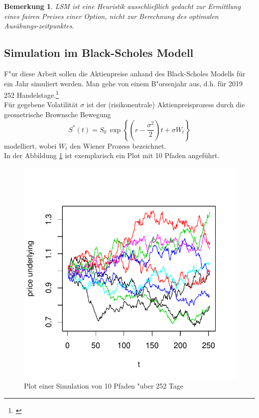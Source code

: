 \documentclass[10pt,a4paper]{article}\usepackage[]{graphicx}\usepackage[]{color}
\makeatletter
\def\maxwidth{ %
  \ifdim\Gin@nat@width>\linewidth
    \linewidth
  \else
    \Gin@nat@width
  \fi
}
\newtheorem{mybem}{Bemerkung}
\makeatother
\begin{document}
\begin{mybem}
LSM ist eine Heuristik ausschließlich gedacht zur Ermittlung eines fairen Preises einer Option, nicht zur Berechnung des optimalen Ausübungs-zeitpunktes.
\end{mybem}

\subsection{Simulation im Black-Scholes Modell}

F"ur diese Arbeit sollen die Aktienpreise anhand des Black-Scholes Modells für ein Jahr simuliert werden. Man gehe von einem B"orsenjahr aus, d.h. für 2019 252 Handelstage.\footnote{\cite[]{boersewien2019}}\\
Für gegebene Volatilität $\sigma$ ist der (risikoneutrale) Aktienpreisprozess durch die geometrische Brownsche Bewegung
$$S^*(t)=S_0\ \exp\left\{  \left(r-\frac{\sigma^2}{2}\right)t + \sigma W_t\right\}$$
modelliert, wobei $W_t$ den Wiener Prozess bezeichnet.\\
In der Abbildung \ref{fig:pfade252} ist exemplarisch ein Plot mit 10 Pfaden angeführt.


\begin{figure}[H]

\includegraphics[width=\maxwidth]{figure/unnamed-chunk-14-1} 

\caption{Plot einer Simulation von 10 Pfaden "uber 252 Tage}
\label{fig:pfade252}
\end{figure}
\end{document}
